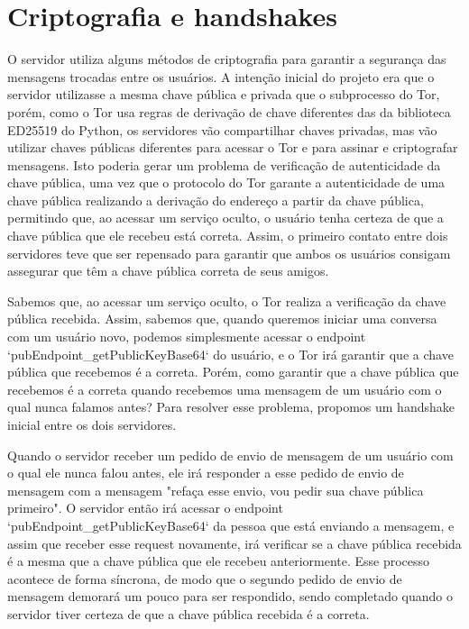 \section{Criptografia e handshakes}

O servidor utiliza alguns métodos de criptografia para garantir a segurança das mensagens trocadas entre os usuários. A intenção inicial do projeto era que o servidor utilizasse a mesma chave pública e privada que o subprocesso do Tor, porém, como o Tor usa regras de derivação de chave diferentes das da biblioteca ED25519 do Python, os servidores vão compartilhar chaves privadas, mas vão utilizar chaves públicas diferentes para acessar o Tor e para assinar e criptografar mensagens. Isto poderia gerar um problema de verificação de autenticidade da chave pública, uma vez que o protocolo do Tor garante a autenticidade de uma chave pública realizando a derivação do endereço a partir da chave pública, permitindo que, ao acessar um serviço oculto, o usuário tenha certeza de que a chave pública que ele recebeu está correta. Assim, o primeiro contato entre dois servidores teve que ser repensado para garantir que ambos os usuários consigam assegurar que têm a chave pública correta de seus amigos.

Sabemos que, ao acessar um serviço oculto, o Tor realiza a verificação da chave pública recebida. Assim, sabemos que, quando queremos iniciar uma conversa com um usuário novo, podemos simplesmente acessar o endpoint `pubEndpoint_getPublicKeyBase64` do usuário, e o Tor irá garantir que a chave pública que recebemos é a correta. Porém, como garantir que a chave pública que recebemos é a correta quando recebemos uma mensagem de um usuário com o qual nunca falamos antes? Para resolver esse problema, propomos um handshake inicial entre os dois servidores.

Quando o servidor receber um pedido de envio de mensagem de um usuário com o qual ele nunca falou antes, ele irá responder a esse pedido de envio de mensagem com a mensagem "refaça esse envio, vou pedir sua chave pública primeiro". O servidor então irá acessar o endpoint `pubEndpoint_getPublicKeyBase64` da pessoa que está enviando a mensagem, e assim que receber esse request novamente, irá verificar se a chave pública recebida é a mesma que a chave pública que ele recebeu anteriormente. Esse processo acontece de forma síncrona, de modo que o segundo pedido de envio de mensagem demorará um pouco para ser respondido, sendo completado quando o servidor tiver certeza de que a chave pública recebida é a correta.

